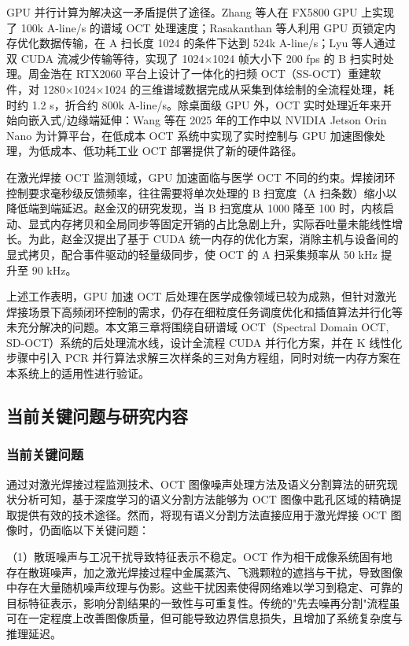 GPU 并行计算为解决这一矛盾提供了途径。Zhang 等人在 FX5800 GPU 上实现了 100k A-line/s 的谱域 OCT 处理速度；Rasakanthan 等人利用 GPU 页锁定内存优化数据传输，在 A 扫长度 1024 的条件下达到 524k A-line/s；Lyu 等人通过双 CUDA 流减少传输等待，实现了 1024$\times$1024 帧大小下 200 fps 的 B 扫实时处理。周金浩在 RTX2060 平台上设计了一体化的扫频 OCT（SS-OCT）重建软件，对 1280$\times$1024$\times$1024 的三维谱域数据完成从采集到体绘制的全流程处理，耗时约 1.2 s，折合约 800k A-line/s。除桌面级 GPU 外，OCT 实时处理近年来开始向嵌入式/边缘端延伸：Wang 等在 2025 年的工作中以 NVIDIA Jetson Orin Nano 为计算平台，在低成本 OCT 系统中实现了实时控制与 GPU 加速图像处理，为低成本、低功耗工业 OCT 部署提供了新的硬件路径。

在激光焊接 OCT 监测领域，GPU 加速面临与医学 OCT 不同的约束。焊接闭环控制要求毫秒级反馈频率，往往需要将单次处理的 B 扫宽度（A 扫条数）缩小以降低端到端延迟。赵金汉的研究发现，当 B 扫宽度从 1000 降至 100 时，内核启动、显式内存拷贝和全局同步等固定开销的占比急剧上升，实际吞吐量未能线性增长。为此，赵金汉提出了基于 CUDA 统一内存的优化方案，消除主机与设备间的显式拷贝，配合事件驱动的轻量级同步，使 OCT 的 A 扫采集频率从 50 kHz 提升至 90 kHz。

上述工作表明，GPU 加速 OCT 后处理在医学成像领域已较为成熟，但针对激光焊接场景下高频闭环控制的需求，仍存在细粒度任务调度优化和插值算法并行化等未充分解决的问题。本文第三章将围绕自研谱域 OCT（Spectral Domain OCT, SD-OCT）系统的后处理流水线，设计全流程 CUDA 并行化方案，并在 K 线性化步骤中引入 PCR 并行算法求解三次样条的三对角方程组，同时对统一内存方案在本系统上的适用性进行验证。

\subsection{当前关键问题与研究内容}

\subsubsection{当前关键问题}
通过对激光焊接过程监测技术、OCT 图像噪声处理方法及语义分割算法的研究现状分析可知，基于深度学习的语义分割方法能够为 OCT 图像中匙孔区域的精确提取提供有效的技术途径。然而，将现有语义分割方法直接应用于激光焊接 OCT 图像时，仍面临以下关键问题：

（1）散斑噪声与工况干扰导致特征表示不稳定。OCT 作为相干成像系统固有地存在散斑噪声，加之激光焊接过程中金属蒸汽、飞溅颗粒的遮挡与干扰，导致图像中存在大量随机噪声纹理与伪影。这些干扰因素使得网络难以学习到稳定、可靠的目标特征表示，影响分割结果的一致性与可重复性。传统的"先去噪再分割"流程虽可在一定程度上改善图像质量，但可能导致边界信息损失，且增加了系统复杂度与推理延迟。


